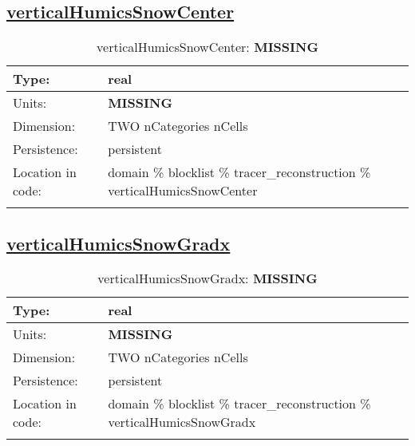 \subsection[verticalHumicsSnowCenter]{\hyperref[sec:var_tab_tracer_reconstruction]{verticalHumicsSnowCenter}}
\label{subsec:var_sec_tracer_reconstruction_verticalHumicsSnowCenter}
\begin{center}
\begin{longtable}{| p{2.0in} | p{4.0in} |}
        \hline 
        Type: & real \\
        \hline 
        Units: & {\bf \color{red} MISSING} \\
        \hline 
        Dimension: & TWO nCategories nCells \\
        \hline 
        Persistence: & persistent \\
        \hline 
         Location in code: & domain \% blocklist \% tracer\_reconstruction \% verticalHumicsSnowCenter \\
         \hline 
    \caption{verticalHumicsSnowCenter: {\bf \color{red} MISSING}}
\end{longtable}
\end{center}
\subsection[verticalHumicsSnowGradx]{\hyperref[sec:var_tab_tracer_reconstruction]{verticalHumicsSnowGradx}}
\label{subsec:var_sec_tracer_reconstruction_verticalHumicsSnowGradx}
\begin{center}
\begin{longtable}{| p{2.0in} | p{4.0in} |}
        \hline 
        Type: & real \\
        \hline 
        Units: & {\bf \color{red} MISSING} \\
        \hline 
        Dimension: & TWO nCategories nCells \\
        \hline 
        Persistence: & persistent \\
        \hline 
         Location in code: & domain \% blocklist \% tracer\_reconstruction \% verticalHumicsSnowGradx \\
         \hline 
    \caption{verticalHumicsSnowGradx: {\bf \color{red} MISSING}}
\end{longtable}
\end{center}
